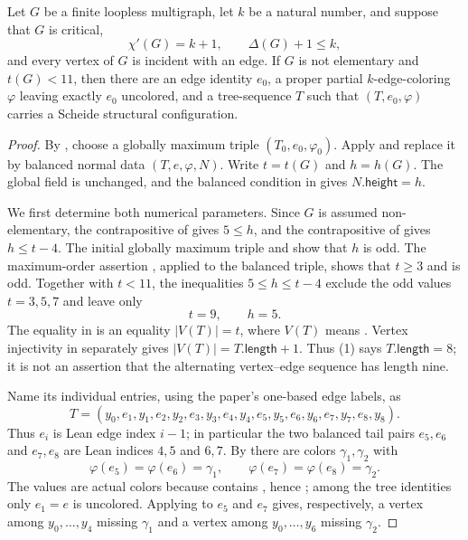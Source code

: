 \begin{lemma}
Let $G$ be a finite loopless multigraph, let $k$ be a natural number, and
suppose that $G$ is critical,
\[
 \chi'(G)=k+1,\qquad \Delta(G)+1\leq k,
\]
and every vertex of $G$ is incident with an edge.  If $G$ is not
elementary and $t(G)<11$, then there are an edge identity $e_0$, a proper
partial $k$-edge-coloring $\varphi$ leaving exactly $e_0$ uncolored, and a
tree-sequence $T$ such that $(T,e_0,\varphi)$ carries a Scheide structural
configuration.
\end{lemma}
\begin{proof}
By , choose a globally maximum triple
$(T_0,e_0,\varphi_0)$.  Apply  and replace
it by balanced normal data $(T,e,\varphi,N)$.  Write $t=t(G)$ and
$h=h(G)$.  The global field is unchanged, and the balanced condition in
 gives $N.\mathsf{height}=h$.

We first determine both numerical parameters.  Since $G$ is assumed
non-elementary, the contrapositive of
 gives $5\leq h$, and the
contrapositive of  gives
$h\leq t-4$.  The initial globally maximum triple and
 show that $h$ is odd.  The maximum-order
assertion , applied to the balanced
triple, shows that $t\geq3$ and is odd.  Together with $t<11$, the inequalities
$5\leq h\leq t-4$ exclude the odd values $t=3,5,7$ and leave only
\[
 t=9,\qquad h=5.                                      \tag{1}
\]
The equality in  is an equality
$|V(T)|=t$, where $V(T)$ means .  Vertex
injectivity in  separately gives
$|V(T)|=T.\mathsf{length}+1$.  Thus (1) says
$T.\mathsf{length}=8$; it is not an assertion that the alternating
vertex--edge sequence has length nine.

Name its individual entries, using the paper's one-based edge labels, as
\[
 T=(y_0,e_1,y_1,e_2,y_2,e_3,y_3,e_4,y_4,
       e_5,y_5,e_6,y_6,e_7,y_7,e_8,y_8).             \tag{2}
\]
Thus $e_i$ is Lean edge index $i-1$; in particular the two balanced
tail pairs $e_5,e_6$ and $e_7,e_8$ are Lean indices $4,5$ and $6,7$.
By  there are colors
$\gamma_1,\gamma_2$ with
\[
 \varphi(e_5)=\varphi(e_6)=\gamma_1,
 \qquad
 \varphi(e_7)=\varphi(e_8)=\gamma_2.                \tag{3}
\]
The values are actual colors because 
contains , hence ; among the
tree identities only $e_1=e$ is uncolored.  Applying
 to $e_5$ and $e_7$ gives, respectively, a vertex
among $y_0,\ldots,y_4$ missing $\gamma_1$ and a vertex among
$y_0,\ldots,y_6$ missing $\gamma_2$.


\end{proof}
